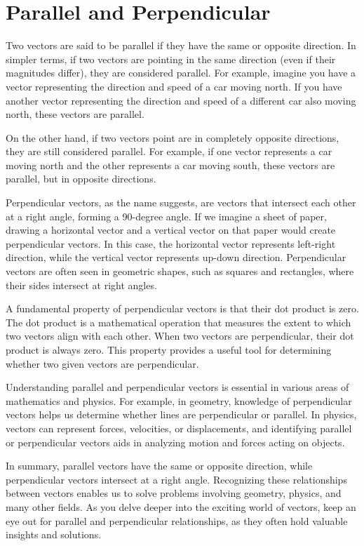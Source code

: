 \chapter{Parallel and Perpendicular}

Two vectors are said to be parallel if they have the same or opposite
direction. In simpler terms, if two vectors are pointing in the same
direction (even if their magnitudes differ), they are considered
parallel. For example, imagine you have a vector representing the
direction and speed of a car moving north. If you have another vector
representing the direction and speed of a different car also moving
north, these vectors are parallel.

On the other hand, if two vectors point are in completely opposite
directions, they are still considered parallel. For example, if one
vector represents a car moving north and the other represents a car
moving south, these vectors are parallel, but in opposite directions.

Perpendicular vectors, as the name suggests, are vectors that
intersect each other at a right angle, forming a 90-degree angle. If
we imagine a sheet of paper, drawing a horizontal vector and a
vertical vector on that paper would create perpendicular vectors. In
this case, the horizontal vector represents left-right direction,
while the vertical vector represents up-down direction. Perpendicular
vectors are often seen in geometric shapes, such as squares and
rectangles, where their sides intersect at right angles.

A fundamental property of perpendicular vectors is that their dot
product is zero. The dot product is a mathematical operation that
measures the extent to which two vectors align with each other. When
two vectors are perpendicular, their dot product is always zero. This
property provides a useful tool for determining whether two given
vectors are perpendicular.

Understanding parallel and perpendicular vectors is essential in
various areas of mathematics and physics. For example, in geometry,
knowledge of perpendicular vectors helps us determine whether lines
are perpendicular or parallel. In physics, vectors can represent
forces, velocities, or displacements, and identifying parallel or
perpendicular vectors aids in analyzing motion and forces acting on
objects.

In summary, parallel vectors have the same or opposite direction,
while perpendicular vectors intersect at a right angle. Recognizing
these relationships between vectors enables us to solve problems
involving geometry, physics, and many other fields. As you delve
deeper into the exciting world of vectors, keep an eye out for
parallel and perpendicular relationships, as they often hold valuable
insights and solutions.
